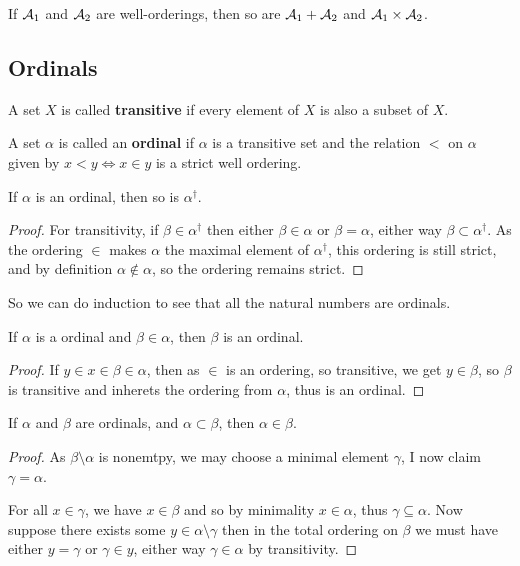 \documentclass{article}
\begin{document}
\begin{lemma}
    If $\mathcal{A}_1$ and $\mathcal{A}_2$ are well-orderings, then so are $\mathcal{A}_1+\mathcal{A}_2$ and $\mathcal{A}_1 \times \mathcal{A}_2$.
\end{lemma}

\subsection{Ordinals}

\begin{definition}
    A set $X$ is called \textbf{transitive} if every element of $X$ is also a subset of $X$.

    A set $\alpha$ is called an \textbf{ordinal} if $\alpha$ is a transitive set and the relation $<$ on $\alpha$ given by $x<y\iff x\in y$ is a strict well ordering.
\end{definition}

\begin{lemma}
    If $\alpha$ is an ordinal, then so is $\alpha^\dagger$.
    \begin{proof}
        For transitivity, if $\beta\in \alpha^\dagger$ then either $\beta\in\alpha$ or $\beta = \alpha$, either way $\beta\subset \alpha^\dagger$. As the ordering $\in$ makes $\alpha$ the maximal element of $\alpha^\dagger$, this ordering is still strict, and by definition $\alpha\not\in\alpha$, so the ordering remains strict.
    \end{proof}
\end{lemma}

So we can do induction to see that all the natural numbers are ordinals.

\begin{lemma}
    If $\alpha$ is a ordinal and $\beta\in\alpha$, then $\beta$ is an ordinal.\begin{proof}
        If $y\in x \in \beta \in \alpha$, then as $\in$ is an ordering, so transitive, we get $y\in \beta$, so $\beta$ is transitive and inherets the ordering from $\alpha$, thus is an ordinal.
    \end{proof}
\end{lemma}

\begin{lemma}
    If $\alpha$ and $\beta$ are ordinals, and $\alpha\subset \beta$, then $\alpha \in \beta$.\begin{proof}
        As $\beta\setminus \alpha$ is nonemtpy, we may choose a minimal element $\gamma$, I now claim $\gamma = \alpha$.

        For all $x\in \gamma$, we have $x\in \beta$ and so by minimality $x\in \alpha$, thus $\gamma\subseteq \alpha$. Now suppose there exists some $y\in \alpha\setminus \gamma$ then in the total ordering on $\beta$ we must have either $y = \gamma$ or $\gamma \in y$, either way $\gamma\in \alpha$ by transitivity.
    \end{proof}
\end{lemma}
\end{document}
